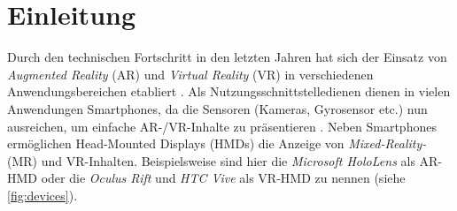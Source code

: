 \chapter{Einleitung}
\label{chap:einleitung}

Durch den technischen Fortschritt in den letzten Jahren hat sich der Einsatz von \emph{Augmented Reality} (AR) und \emph{Virtual Reality} (VR) in verschiedenen Anwendungsbereichen etabliert \parencites[1]{Krevelen2010}{Zhao2009}[58]{Sharples2008}[1]{Jung2008}.
Als Nutzungsschnittstelledienen dienen in vielen Anwendungen Smartphones, da die Sensoren (Kameras, Gyrosensor etc.) nun ausreichen, um einfache AR-/VR-Inhalte zu präsentieren \parencites{Li2017b}{Feng2017}{Yoo2015}{Mulloni2012}.
Neben Smartphones ermöglichen Head-Mounted Displays (HMDs) die Anzeige von \emph{Mixed-Reality-} (MR) und VR-Inhalten.
Beispielsweise sind hier die \emph{Microsoft HoloLens} \parencite{Microsoft2018} als AR-HMD oder die \emph{Oculus Rift} \parencite{Facebook2018} und \emph{HTC Vive} \parencite{HTCCorporation2018} als VR-HMD zu nennen (siehe \autoref{fig:devices}).
